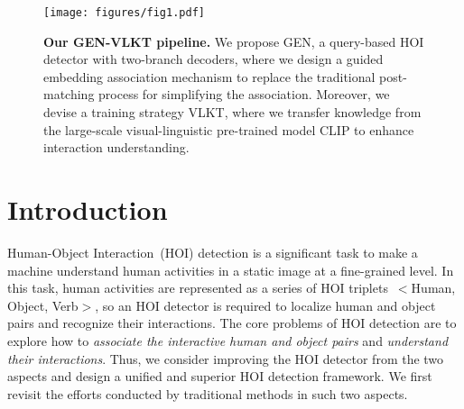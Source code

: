 \documentclass[10pt,twocolumn,letterpaper]{article}
\begin{document}
\begin{figure}[h]
  \centering
  \texttt{[image: figures/fig1.pdf]}
  \vspace{-4.5mm}
  \caption{\textbf{Our GEN-VLKT pipeline.} We propose GEN, a query-based HOI detector with two-branch decoders, where we design a guided embedding association mechanism to replace the traditional post-matching process for simplifying the association. Moreover, we devise a training strategy VLKT, where we transfer knowledge from the large-scale visual-linguistic pre-trained model CLIP to enhance interaction understanding.}
  \label{fig:first}
   \vspace{-3mm}
\end{figure}

\vspace{-4mm}\section{Introduction}
\vspace{-1.5mm}
\label{sec:intro}


Human-Object Interaction~(HOI) detection is a significant task to make a machine understand human activities in a static image at a fine-grained level. In this task, human activities are represented as a series of HOI triplets~$<$Human, Object, Verb$>$, so an HOI detector is required to localize human and object pairs and recognize their interactions. The core problems of HOI detection are to explore how to \emph{associate the interactive human and object pairs} and \emph{understand their interactions}. Thus, we consider improving the HOI detector from the two aspects and design a unified and superior HOI detection framework. We first revisit the efforts conducted by traditional methods in such two aspects.
\end{document}

